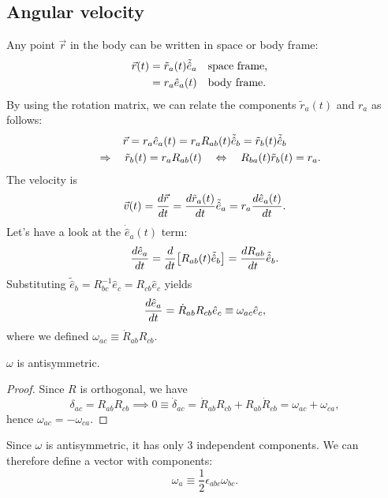 \documentclass{article}
\begin{document}
\subsection{Angular velocity}
Any point $\vec{r}$ in the body can be written in space or body frame:
\begin{align*}
    \vec{r}(t) &= \tilde{r}_a(t) \tilde{\hat{e}}_a \qq{space frame,} \\
    &= r_a \hat{e}_a (t) \qq{body frame.}
\end{align*}
By using the rotation matrix, we can relate the components $\tilde{r}_a(t)$ and $r_a$ as follows:
\begin{gather*}
    \vec{r} = r_a \hat{e}_a(t) = r_a R_{ab}(t) \tilde{\hat{e}}_b = \tilde{r}_b(t) \tilde{\hat{e}}_b \\
    \quad \Rightarrow \quad \tilde{r}_b(t) = r_a R_{ab}(t) \quad \Leftrightarrow \quad R_{ba}(t) \tilde{r}_b(t) = r_a.
\end{gather*}
The velocity is
\begin{equation}
    \vec{v}(t) = \dv{\vec{r}}{t} = \dv{\tilde{r}_a(t)}{t} \tilde{\hat{e}}_a = r_a \dv{\hat{e}_a(t)}{t}.
\end{equation}
Let's have a look at the $\dot{\hat{e}}_a(t)$ term:
\begin{equation}
    \dv{\hat{e}_a}{t} = \dv{}{t} \qty[R_{ab}(t) \tilde{\hat{e}}_b] = \dv{R_{ab}}{t} \tilde{\hat{e}}_b.
\end{equation}
Substituting $\tilde{\hat{e}}_b = R^{-1}_{bc} \hat{e}_c = R_{cb} \hat{e}_c$ yields
\begin{equation}
    \dv{\hat{e}_a}{t} = \dot{R}_{ab} R_{cb} \hat{e}_c \equiv \omega_{ac} \hat{e}_c,
\end{equation}
where we defined $\omega_{ac} \equiv \dot{R}_{ab} R_{cb}$.
\begin{proposition}
    $\omega$ is antisymmetric.
\end{proposition}
\begin{proof}
    Since $R$ is orthogonal, we have
    \[
        \delta_{ac} = R_{ab} R_{cb} \implies 0 \equiv \dot{\delta}_{ac} = \dot{R}_{ab} R_{cb} + R_{ab}\dot{R}_{cb} = \omega_{ac} + \omega_{ca},
    \]
    hence $\omega_{ac} = - \omega_{ca}$.
\end{proof}
Since $\omega$ is antisymmetric, it has only 3 independent components. We can therefore define a vector with components:
\begin{equation} \label{angularvelocity}
    \omega_a \equiv \frac{1}{2} \epsilon_{abc} \omega_{bc}.
\end{equation}
\end{document}
